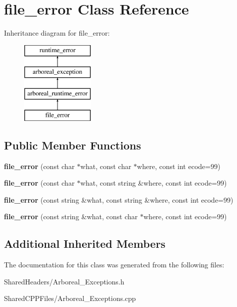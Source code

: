 \hypertarget{classfile__error}{}\section{file\+\_\+error Class Reference}
\label{classfile__error}
Inheritance diagram for file\+\_\+error\+:\begin{figure}[H]
\begin{center}
\leavevmode
\includegraphics[height=4.000000cm]{db/ddf/classfile__error}
\end{center}
\end{figure}
\subsection*{Public Member Functions}
\begin{DoxyCompactItemize}
\item 
\mbox{\label{classfile__error_a10da41c5d15b25fdafa97ae79523e242}} 
{\bfseries file\+\_\+error} (const char $\ast$what, const char $\ast$where, const int ecode=99)
\item 
\mbox{\label{classfile__error_ae70ca16a0a8eee95a88a64128b7fcbad}} 
{\bfseries file\+\_\+error} (const char $\ast$what, const string \&where, const int ecode=99)
\item 
\mbox{\label{classfile__error_a9b1c03f989df972ca3201f984ddece6d}} 
{\bfseries file\+\_\+error} (const string \&what, const string \&where, const int ecode=99)
\item 
\mbox{\label{classfile__error_a2698ca75c20dd3ffc5adb8d470fff246}} 
{\bfseries file\+\_\+error} (const string \&what, const char $\ast$where, const int ecode=99)
\end{DoxyCompactItemize}
\subsection*{Additional Inherited Members}


The documentation for this class was generated from the following files\+:\begin{DoxyCompactItemize}
\item 
Shared\+Headers/Arboreal\+\_\+\+Exceptions.\+h\item 
Shared\+C\+P\+P\+Files/Arboreal\+\_\+\+Exceptions.\+cpp\end{DoxyCompactItemize}
